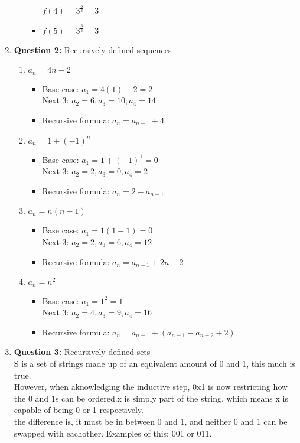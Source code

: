 \documentclass[11pt]{article}
\begin{document}
\begin{enumerate}
\begin{enumerate}[label=(\alph*)]
\begin{itemize}
        $f(4) = 3^\frac{3}{3} = 3$
        \item 
        $f(5) = 3^\frac{3}{3} = 3$
    \end{itemize}
\end{enumerate}
\item
\textbf{Question 2:} Recursively defined sequences
\begin{enumerate}[label=(\alph*)]
    \item
    $a_n = 4n-2$
    \begin{itemize}
        \item 
        Base case: $a_1 = 4(1)-2 = 2$ \\
        Next 3: $a_2 = 6, a_3 = 10, a_4 = 14$
        \item 
        Recursive formula: $a_n = a_{n-1} + 4$
    \end{itemize}
    \item 
    $a_n = 1+ (-1)^n$
    \begin{itemize}
        \item 
        Base case: $a_1 = 1 + (-1)^1 = 0$ \\
        Next 3: $a_2 = 2, a_3 = 0, a_4 = 2$
        \item 
        Recursive formula: $a_n =2-a_{n-1}$
    \end{itemize}
    \item 
    $a_n = n(n-1)$
    \begin{itemize}
        \item 
        Base case: $a_1 = 1(1-1) = 0$\\
        Next 3: $a_2 = 2, a_3 = 6, a_4 = 12$
        \item 
        Recursive formula: $a_n = a_{n-1} + 2n-2$
    \end{itemize}
    \item 
    $a_n = n^2$ 
    \begin{itemize}
        \item 
        Base case: $a_1 = 1^2 = 1$ \\
        Next 3: $a_2 = 4, a_3 = 9, a_4 = 16$
        \item 
        Recursive formula: $a_n = a_{n-1} + (a_{n-1} - a_{n-2} +2)$
    \end{itemize}
\end{enumerate}
\item
\textbf{Question 3:} Recursively defined sets\\
S is a set of strings made up of an equivalent amount of 0 and 1, this much is true. \\
However, when aknowledging the inductive step, 0x1 is now restricting how the 0 and 1s can be ordered.x is simply part of the string, which means x is capable of being 0 or 1 respectively. \\
the difference is, it must be in between 0 and 1, and neither 0 and 1 can be swapped with eachother.
Examples of this: 001 or 011.

\end{enumerate}
\end{document}
